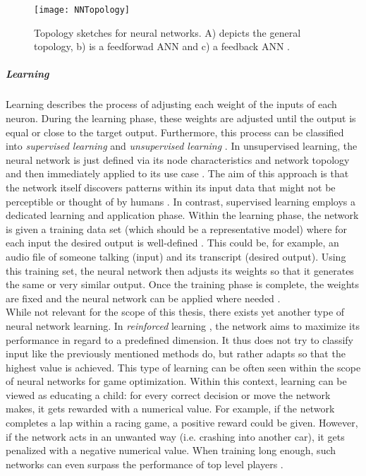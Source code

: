 \documentclass[draft,final]{vutinfth} %
\begin{document}
\begin{figure}
\begin{center}
\texttt{[image: NNTopology]}
\end{center}
\caption{Topology sketches for neural networks. A) depicts the general topology, b) is a feedforwad ANN and c) a feedback ANN \cite{zou2009overview}.}
\end{figure}

\subparagraph{Learning} Learning describes the process of adjusting each weight of the inputs of each neuron. During the learning phase, these weights are adjusted until the output is equal or close to the target output. Furthermore, this process can be classified into \emph{supervised learning} and \emph{unsupervised learning} \cite{zou2009overview}. In unsupervised learning, the neural network is just defined via its node characteristics and network topology and then immediately applied to its use case \cite{james2023unsupervised}. The aim of this approach is that the network itself discovers patterns within its input data that might not be perceptible or thought of by humans \cite{james2023unsupervised}.
In contrast, supervised learning employs a dedicated learning and application phase. Within the learning phase, the network is given a training data set (which should be a representative model) where for each input the desired output is well-defined \cite{wang2020supervised}. This could be, for example, an audio file of someone talking (input) and its transcript (desired output). Using this training set, the neural network then adjusts its weights  so that it generates the same  or very similar output. 
Once the training phase is complete, the weights are fixed and the neural network can be applied where needed \cite{wang2020supervised}.  \\
While not relevant for the scope of this thesis, there exists yet another type of neural network learning. In \emph{reinforced} learning \cite{mahesh2020machine}, the network aims to maximize its performance in regard to a predefined dimension. It thus does not try to classify input like the previously mentioned methods do, but rather adapts so that the highest value is achieved. This type of learning can be often seen within the scope of neural networks for game optimization. Within this context, learning can be viewed as educating a child: for every correct decision or move the network makes, it gets rewarded with a numerical value. For example, if the network completes a lap within a racing game, a positive reward could be given. However, if the network acts in an unwanted way (i.e. crashing into another car), it gets penalized with a negative numerical value. When training long enough, such networks can even surpass the performance of top level players \cite{mahesh2020machine}.
\end{document}
